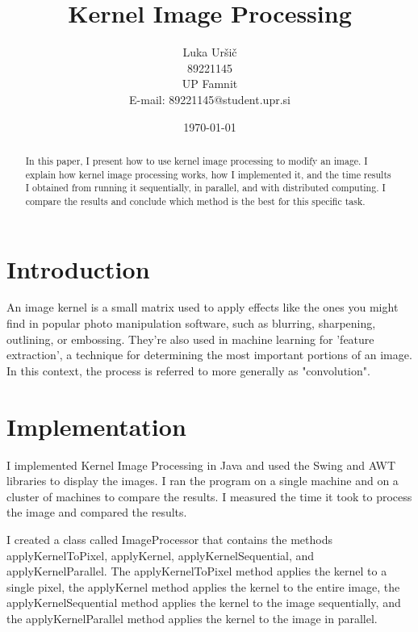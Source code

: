 \documentclass{article}
\title{Kernel Image Processing}
\author{Luka Uršič \\ 89221145 \\ UP Famnit \\ E-mail: 89221145@student.upr.si}
\date{\today}
\begin{document}
\maketitle
\thispagestyle{empty}

\begin{abstract}
    In this paper, I present how to use kernel image processing to modify an image. I explain how kernel image processing works, how I implemented it, and the time results I obtained from running it sequentially, in parallel, and with distributed computing. I compare the results and conclude which method is the best for this specific task.
\end{abstract}

\begin{multicols}{2}

    \section{Introduction}
    An image kernel is a small matrix used to apply effects like the ones you might find in popular photo manipulation software, such as blurring, sharpening, outlining, or embossing. They're also used in machine learning for 'feature extraction', a technique for determining the most important portions of an image. In this context, the process is referred to more generally as "convolution".

    \cite{setosa}

    \section{Implementation}
    I implemented Kernel Image Processing in Java and used the Swing and AWT libraries to display the images. I ran the program on a single machine and on a cluster of machines to compare the results. I measured the time it took to process the image and compared the results.

    I created a class called ImageProcessor that contains the methods applyKernelToPixel, applyKernel, applyKernelSequential, and applyKernelParallel. The applyKernelToPixel method applies the kernel to a single pixel, the applyKernel method applies the kernel to the entire image, the applyKernelSequential method applies the kernel to the image sequentially, and the applyKernelParallel method applies the kernel to the image in parallel.


\end{multicols}
\end{document}
